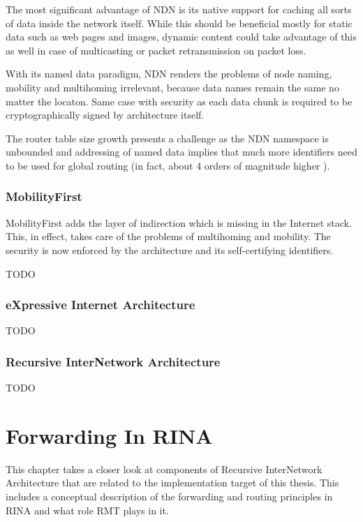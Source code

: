             The most significant advantage of NDN is its native support for caching all sorts of data inside the network itself. While this should be beneficial mostly for static data such as web pages and images, dynamic content could take advantage of this as well in case of multicasting or packet retransmission on packet loss.

            With its named data paradigm, NDN renders the problems of node naming, mobility and multihoming irrelevant, because data names remain the same no matter the locaton. Same case with security as each data chunk is required to be cryptographically signed by architecture itself.

            The router table size growth presents a challenge as the NDN namespace is unbounded and addressing of named data implies that much more identifiers need to be used for global routing (in fact, about 4 orders of magnitude higher \cite{NDNvsMF}).

        \subsection{MobilityFirst}

            MobilityFirst adds the layer of indirection which is missing in the Internet stack. This, in effect, takes care of the problems of multihoming and mobility. The security is now enforced by the architecture and its self-certifying identifiers.

            TODO

        \subsection{eXpressive Internet Architecture}

            TODO

        \subsection{Recursive InterNetwork Architecture}

            TODO


\chapter{Forwarding In RINA}\label{forwarding}

    This chapter takes a closer look at components of Recursive InterNetwork Architecture that are related to the implementation target of this thesis. This includes a conceptual description of the forwarding and routing principles in RINA and what role RMT plays in it.

